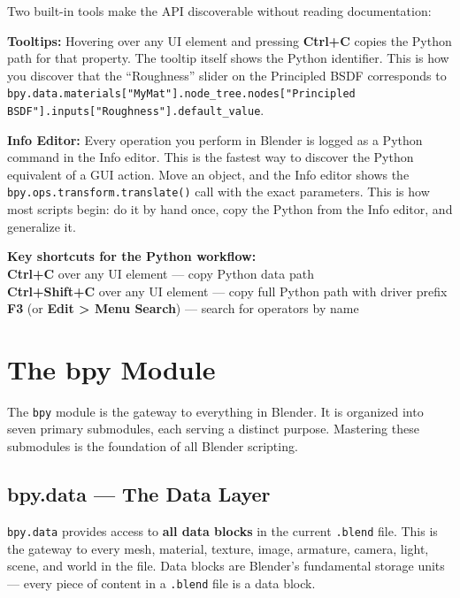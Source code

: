 Two built-in tools make the API discoverable without reading documentation:

\textbf{Tooltips:} Hovering over any UI element and pressing \textbf{Ctrl+C} copies the Python path for that property. The tooltip itself shows the Python identifier. This is how you discover that the ``Roughness'' slider on the Principled BSDF corresponds to \texttt{bpy.data.materials["MyMat"].node\_tree.nodes["Principled BSDF"].inputs["Roughness"].default\_value}.

\textbf{Info Editor:} Every operation you perform in Blender is logged as a Python command in the Info editor. This is the fastest way to discover the Python equivalent of a GUI action. Move an object, and the Info editor shows the \texttt{bpy.ops.transform.translate()} call with the exact parameters. This is how most scripts begin: do it by hand once, copy the Python from the Info editor, and generalize it.

\begin{shortcutbox}
\textbf{Key shortcuts for the Python workflow:}\\
\textbf{Ctrl+C} over any UI element --- copy Python data path\\
\textbf{Ctrl+Shift+C} over any UI element --- copy full Python path with driver prefix\\
\textbf{F3} (or \textbf{Edit > Menu Search}) --- search for operators by name
\end{shortcutbox}


\section{The bpy Module}
\label{sec:scripting-bpy}

The \texttt{bpy} module is the gateway to everything in Blender. It is organized into seven primary submodules, each serving a distinct purpose. Mastering these submodules is the foundation of all Blender scripting.

\subsection{bpy.data --- The Data Layer}

\texttt{bpy.data} provides access to \textbf{all data blocks} in the current \texttt{.blend} file. This is the gateway to every mesh, material, texture, image, armature, camera, light, scene, and world in the file. Data blocks are Blender's fundamental storage units --- every piece of content in a \texttt{.blend} file is a data block.

